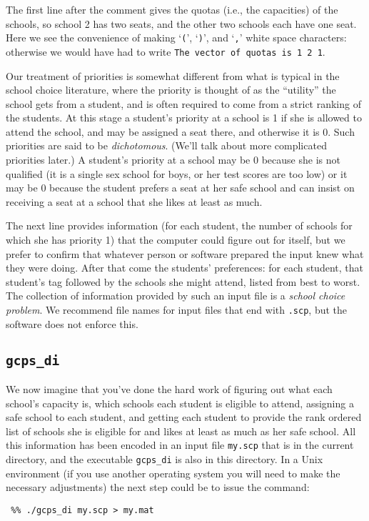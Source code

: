 \documentclass[12pt]{article}
\theoremstyle{definition}
\begin{document}
The first line after the comment gives the quotas (i.e., the
capacities) of the schools, so school 2 has two seats, and the other
two schools each have one seat.  Here we see the convenience of making
`\texttt{(}', `\texttt{)}', and `\texttt{,}' white space characters:
otherwise we would have had to write \texttt{The vector of quotas is 1
  2 1}.

Our treatment of priorities is somewhat different from what is typical
in the school choice literature, where the priority is thought of as
the ``utility'' the school gets from a student, and is often required
to come from a strict ranking of the students.  At this stage a
student's priority at a school is 1 if she is allowed to attend the
school, and may be assigned a seat there, and otherwise it is 0.  Such
priorities are said to be \emph{dichotomous}.  (We'll talk about more
complicated priorities later.)  A student's priority at a school may
be 0 because she is not qualified (it is a single sex school for boys,
or her test scores are too low) or it may be 0 because the student
prefers a seat at her safe school and can insist on receiving a seat
at a school that she likes at least as much.

The next line provides information (for each student, the number of
schools for which she has priority 1) that the computer could figure
out for itself, but we prefer to confirm that whatever person or
software prepared the input knew what they were doing.  After that
come the students' preferences: for each student, that student's tag
followed by the schools she might attend, listed from best to worst.
The collection of information provided by such an input file is a
\emph{school choice problem}.  We recommend file names for input files
that end with \texttt{.scp}, but the software does not enforce this.

\subsection{\texttt{gcps\_di}}

We now imagine that you've done the hard work of figuring out what
each school's capacity is, which schools each student is eligible to
attend, assigning a safe school to each student, and getting each
student to provide the rank ordered list of schools she is eligible
for and likes at least as much as her safe school.  All this
information has been encoded in an input file \texttt{my.scp} that is
in the current directory, and the executable \texttt{gcps\_di} is also
in this directory.  In a Unix environment (if you use another
operating system you will need to make the necessary adjustments) the
next step could be to issue the command:
\begin{obeylines}
  \texttt{
    \%\% ./gcps\_di my.scp > my.mat
    }
\end{obeylines}
\bigskip
\end{document}
